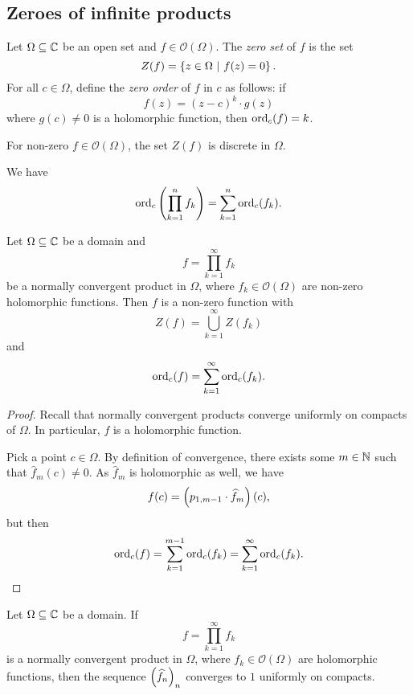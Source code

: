 \newpage

\subsection{Zeroes of infinite products}


\begin{definicija}
Let $\Omega \subseteq \mathbb{C}$ be an open set and
$f \in \mathcal{O}(\Omega)$. The \emph{zero set} of
$f$ is the set
\[
Z(f) = \left\{z \in \Omega~\middle\vert~f(z) = 0\right\}.
\]
For all $c \in \Omega$, define the
\emph{zero order} of $f$ in $c$ as follows: if
\[
f(z) = (z - c)^k \cdot g(z)
\]
where $g(c) \ne 0$ is a holomorphic function, then $\operatorname{ord}_c(f) = k$.
\end{definicija}

\begin{opomba}
For non-zero $f \in \mathcal{O}(\Omega)$, the set $Z(f)$ is
discrete in $\Omega$.
\end{opomba}

\begin{opomba}
We have
\[
\operatorname{ord}_c \left(\prod_{k=1}^n f_k\right) = \sum_{k=1}^n \operatorname{ord}_c(f_k).
\]
\end{opomba}

\begin{lema}
Let $\Omega \subseteq \mathbb{C}$ be a domain and
\[
f = \prod_{k=1}^\infty f_k
\]
be a normally convergent product in $\Omega$, where
$f_k \in \mathcal{O}(\Omega)$ are non-zero holomorphic functions.
Then $f$ is a non-zero function with
\[
Z(f) = \bigcup_{k=1}^\infty Z(f_k)
\]
and
\[
\operatorname{ord}_c(f) = \sum_{k=1}^\infty \operatorname{ord}_c(f_k).
\]
\end{lema}

\begin{proof}
Recall that normally convergent products converge uniformly on
compacts of $\Omega$. In particular, $f$ is a holomorphic function.

Pick a point $c \in \Omega$. By definition of convergence, there
exists some $m \in \mathbb{N}$ such that $\widehat{f}_m(c) \ne 0$. As
$\widehat{f}_m$ is holomorphic as well, we have
\[
f(c) = \left(p_{1, m-1} \cdot \widehat{f}_m\right)(c),
\]
but then
\[
\operatorname{ord}_c(f) =
\sum_{k=1}^{m-1} \operatorname{ord}_c(f_k) =
\sum_{k=1}^\infty \operatorname{ord}_c(f_k). \qedhere
\]
\end{proof}

\begin{lema}
Let $\Omega \subseteq \mathbb{C}$ be a domain. If
\[
f = \prod_{k=1}^\infty f_k
\]
is a normally convergent product in $\Omega$, where
$f_k \in \mathcal{O}(\Omega)$ are holomorphic functions, then the
sequence $\left(\widehat{f}_n\right)_n$ converges to $1$ uniformly on
compacts.
\end{lema}

